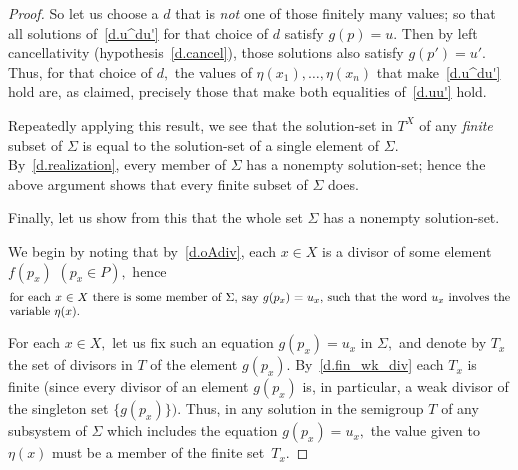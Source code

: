 \documentclass[10pt,a4paper]{amsart}
\begin{document}
\begin{proof}
So let us choose a $d$ that is {\em not} one of those finitely
many values; so that all solutions of~\eqref{d.u^du'}
for that choice of $d$ satisfy $g(p)=u.$
Then by left cancellativity (hypothesis~\eqref{d.cancel}),
those solutions also satisfy $g(p')=u'.$
Thus, for that choice of $d,$ the values of
$\eta(x_1),\dots,\eta(x_n)$ that make~\eqref{d.u^du'} hold are, as
claimed, precisely those that make both equalities of~\eqref{d.uu'}
hold.

Repeatedly applying this result, we see that the solution-set
in $T^X$ of any {\em finite} subset of $\Sigma$ is
equal to the solution-set of a single element of $\Sigma.$
By~\eqref{d.realization}, every member of $\Sigma$
has a nonempty solution-set; hence the above argument
shows that every finite subset of $\Sigma$ does.

Finally, let us show from this that the whole set $\Sigma$
has a nonempty solution-set.

We begin by noting that by~\eqref{d.oAdiv}, each $x\in X$ is
a divisor of some element $f(p_x)$ $(p_x\in P),$ hence
%
\begin{equation}\begin{minipage}[c]{35pc}\label{d.u_x}
for each $x\in X$
there is some member of $\Sigma,$ say $g(p_x) = u_x,$ such that
the word $u_x$ involves the variable $\eta(x).$
\end{minipage}\end{equation}

For each $x\in X,$ let us fix such an equation $g(p_x)=u_x$ in $\Sigma,$
and denote by $T_x$ the set of divisors in $T$ of the element $g(p_x).$
By~\eqref{d.fin_wk_div} each $T_x$ is finite
(since every divisor of an element $g(p_x)$ is, in particular,
a weak divisor of the singleton set $\{g(p_x)\}).$
Thus, in any solution in the semigroup $T$ of any subsystem
of $\Sigma$ which includes the equation $g(p_x) = u_x,$ the
value given to $\eta(x)$ must be a member of the finite set~$T_x.$


\end{proof}
\end{document}
